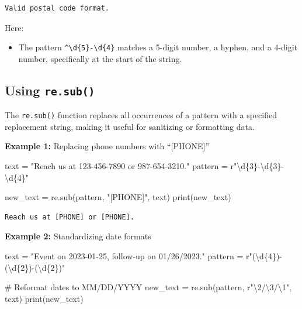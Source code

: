 \documentclass[
  letterpaper,
  DIV=11,
  numbers=noendperiod]{scrreprt}
\newenvironment{Shaded}{\begin{snugshade}}{\end{snugshade}}
\newcommand{\BuiltInTok}[1]{\textcolor[rgb]{0.00,0.23,0.31}{#1}}
\newcommand{\CommentTok}[1]{\textcolor[rgb]{0.37,0.37,0.37}{#1}}
\newcommand{\NormalTok}[1]{\textcolor[rgb]{0.00,0.23,0.31}{#1}}
\newcommand{\OperatorTok}[1]{\textcolor[rgb]{0.37,0.37,0.37}{#1}}
\newcommand{\SpecialCharTok}[1]{\textcolor[rgb]{0.37,0.37,0.37}{#1}}
\newcommand{\StringTok}[1]{\textcolor[rgb]{0.13,0.47,0.30}{#1}}
\newcommand{\VerbatimStringTok}[1]{\textcolor[rgb]{0.13,0.47,0.30}{#1}}
\providecommand{\tightlist}{%
  \setlength{\itemsep}{0pt}\setlength{\parskip}{0pt}}\usepackage{longtable,booktabs,array}
\begin{document}
\begin{verbatim}
Valid postal code format.
\end{verbatim}

Here:

\begin{itemize}
\tightlist
\item
  The pattern \texttt{\^{}\textbackslash{}d\{5\}-\textbackslash{}d\{4\}}
  matches a 5-digit number, a hyphen, and a 4-digit number, specifically
  at the start of the string.
\end{itemize}

\hypertarget{using-re.sub}{%
\subsection{\texorpdfstring{Using
\texttt{re.sub()}}{Using re.sub()}}\label{using-re.sub}}

The \texttt{re.sub()} function replaces all occurrences of a pattern
with a specified replacement string, making it useful for sanitizing or
formatting data.

\textbf{Example 1:} Replacing phone numbers with ``{[}PHONE{]}''

\begin{Shaded}
\begin{Highlighting}[]
\NormalTok{text }\OperatorTok{=} \StringTok{"Reach us at 123{-}456{-}7890 or 987{-}654{-}3210."}
\NormalTok{pattern }\OperatorTok{=} \VerbatimStringTok{r"\textbackslash{}d}\SpecialCharTok{\{3\}}\VerbatimStringTok{{-}\textbackslash{}d}\SpecialCharTok{\{3\}}\VerbatimStringTok{{-}\textbackslash{}d}\SpecialCharTok{\{4\}}\VerbatimStringTok{"}

\NormalTok{new\_text }\OperatorTok{=}\NormalTok{ re.sub(pattern, }\StringTok{"[PHONE]"}\NormalTok{, text)}
\BuiltInTok{print}\NormalTok{(new\_text)  }
\end{Highlighting}
\end{Shaded}

\begin{verbatim}
Reach us at [PHONE] or [PHONE].
\end{verbatim}

\textbf{Example 2:} Standardizing date formats

\begin{Shaded}
\begin{Highlighting}[]
\NormalTok{text }\OperatorTok{=} \StringTok{"Event on 2023{-}01{-}25, follow{-}up on 01/26/2023."}
\NormalTok{pattern }\OperatorTok{=} \VerbatimStringTok{r"(\textbackslash{}d}\SpecialCharTok{\{4\}}\VerbatimStringTok{){-}(\textbackslash{}d}\SpecialCharTok{\{2\}}\VerbatimStringTok{){-}(\textbackslash{}d}\SpecialCharTok{\{2\}}\VerbatimStringTok{)"}

\CommentTok{\# Reformat dates to MM/DD/YYYY}
\NormalTok{new\_text }\OperatorTok{=}\NormalTok{ re.sub(pattern, }\VerbatimStringTok{r"\textbackslash{}2/\textbackslash{}3/\textbackslash{}1"}\NormalTok{, text)}
\BuiltInTok{print}\NormalTok{(new\_text)  }
\end{Highlighting}
\end{Shaded}
\end{document}
